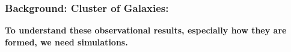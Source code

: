 \documentclass[aspectratio=1610]{beamer}
\begin{document}
\begin{frame}
  \frametitle{Background: Cluster of Galaxies:}
  {\bf To understand these observational results, especially how they are formed, we need simulations.}

  \begin{center}
  \end{center}
\end{frame}
\end{document}
